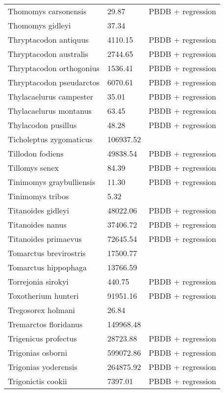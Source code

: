 \begin{center}
\begin{longtable}{p{} p{} p{} }
  Thomomys carsonensis & 29.87 & PBDB + regression \\ 
  Thomomys gidleyi & 37.34 & \cite{Tomiya2013} \\ 
  Thryptacodon antiquus & 4110.15 & PBDB + regression \\ 
  Thryptacodon australis & 2744.65 & PBDB + regression \\ 
  Thryptacodon orthogonius & 1536.41 & PBDB + regression \\ 
  Thryptacodon pseudarctos & 6070.61 & PBDB + regression \\ 
  Thylacaelurus campester & 35.01 & PBDB + regression \\ 
  Thylacaelurus montanus & 63.45 & PBDB + regression \\ 
  Thylacodon pusillus & 48.28 & PBDB + regression \\ 
  Ticholeptus zygomaticus & 106937.52 & \cite{Tomiya2013} \\ 
  Tillodon fodiens & 49838.54 & PBDB + regression \\ 
  Tillomys senex & 84.39 & PBDB + regression \\ 
  Tinimomys graybulliensis & 11.30 & PBDB + regression \\ 
  Tinimomys tribos & 5.32 & \cite{Skinner1972} \\ 
  Titanoides gidleyi & 48022.06 & PBDB + regression \\ 
  Titanoides nanus & 37406.72 & PBDB + regression \\ 
  Titanoides primaevus & 72645.54 & PBDB + regression \\ 
  Tomarctus brevirostris & 17500.77 & \cite{Tomiya2013} \\ 
  Tomarctus hippophaga & 13766.59 & \cite{Tomiya2013} \\ 
  Torrejonia sirokyi & 440.75 & PBDB + regression \\ 
  Toxotherium hunteri & 91951.16 & PBDB + regression \\ 
  Tregosorex holmani & 26.84 & \cite{Tomiya2013} \\ 
  Tremarctos floridanus & 149968.48 & \cite{Smith2004} \\ 
  Trigenicus profectus & 28723.88 & PBDB + regression \\ 
  Trigonias osborni & 599072.86 & PBDB + regression \\ 
  Trigonias yoderensis & 264875.92 & PBDB + regression \\ 
  Trigonictis cookii & 7397.01 & PBDB + regression \\ 

\end{longtable}
\end{center}
